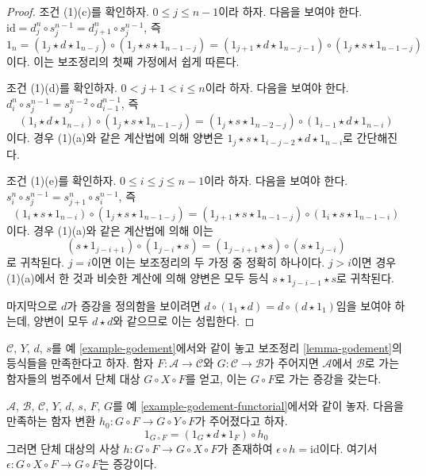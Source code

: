 \begin{proof}
\medskip\noindent
조건 (1)(c)를 확인하자. $0 \leq j \leq n - 1$이라 하자. 다음을
보여야 한다.
$\text{id} = d^n_j \circ s^{n - 1}_j = d^n_{j + 1} \circ s^{n - 1}_j$, 즉
$$
1_n =
(1_j \star d \star 1_{n - j}) \circ
(1_j \star s \star 1_{n - 1 - j}) =
(1_{j + 1} \star d \star 1_{n - j - 1}) \circ
(1_j \star s \star 1_{n - 1 - j})
$$
이다. 이는 보조정리의 첫째 가정에서 쉽게 따른다.

\medskip\noindent
조건 (1)(d)를 확인하자. $0 < j + 1 < i \leq n$이라 하자. 다음을
보여야 한다.
$d^n_i \circ s^{n - 1}_j = s^{n - 2}_j \circ d^{n - 1}_{i - 1}$, 즉
$$
(1_i \star d \star 1_{n - i}) \circ
(1_j \star s \star 1_{n - 1 - j}) =
(1_j \star s \star 1_{n - 2 - j}) \circ
(1_{i - 1} \star d \star 1_{n - i})
$$
이다. 경우 (1)(a)와 같은 계산법에 의해 양변은
$1_j \star s \star 1_{i - j - 2} \star d \star 1_{n - i}$로
간단해진다.

\medskip\noindent
조건 (1)(e)를 확인하자. $0 \leq i \leq j \leq n - 1$이라 하자.
다음을 보여야 한다.
$s^n_i \circ s^{n - 1}_j = s^n_{j + 1} \circ s^{n - 1}_i$, 즉
$$
(1_i \star s \star 1_{n - i}) \circ
(1_j \star s \star 1_{n - 1 - j}) =
(1_{j + 1} \star s \star 1_{n - 1 - j}) \circ
(1_i \star s \star 1_{n - 1 - i})
$$
이다. 경우 (1)(a)와 같은 계산법에 의해 이는
$$
(s \star 1_{j - i + 1}) \circ (1_{j - i} \star s) =
(1_{j - i + 1} \star s) \circ (s \star 1_{j - i})
$$
로 귀착된다. $j = i$이면 이는 보조정리의 두 가정 중 정확히 하나이다.
$j > i$이면 경우 (1)(a)에서 한 것과 비슷한 계산에 의해 양변은 모두
등식 $s \star 1_{j - i - 1} \star s$로 귀착된다.

\medskip\noindent
마지막으로 $d$가 증강을 정의함을 보이려면
$d \circ (1_1 \star d) = d \circ (d \star 1_1)$임을 보여야 하는데,
양변이 모두 $d \star d$와 같으므로 이는 성립한다.
\end{proof}

\begin{example}
\label{example-godement-functorial}
$\mathcal{C}$, $Y$, $d$, $s$를 예 \ref{example-godement}에서와 같이
놓고 보조정리 \ref{lemma-godement}의 등식들을 만족한다고 하자.
함자 $F : \mathcal{A} \to \mathcal{C}$와
$G : \mathcal{C} \to \mathcal{B}$가 주어지면 $\mathcal{A}$에서
$\mathcal{B}$로 가는 함자들의 범주에서 단체 대상
$G \circ X \circ F$를 얻고, 이는 $G \circ F$로 가는 증강을 갖는다.
\end{example}

\begin{lemma}
\label{lemma-godement-section}
$\mathcal{A}$, $\mathcal{B}$, $\mathcal{C}$, $Y$, $d$, $s$, $F$, $G$를
예 \ref{example-godement-functorial}에서와 같이 놓자. 다음을 만족하는
함자 변환 $h_0 : G \circ F \to G \circ Y \circ F$가 주어졌다고 하자.
$$
1_{G \circ F} = (1_G \star d \star 1_F) \circ h_0
$$
그러면 단체 대상의 사상 $h : G \circ F \to G \circ X \circ F$가
존재하여 $\epsilon \circ h = \text{id}$이다. 여기서
$\epsilon : G \circ X \circ F \to G \circ F$는 증강이다.
\end{lemma}

